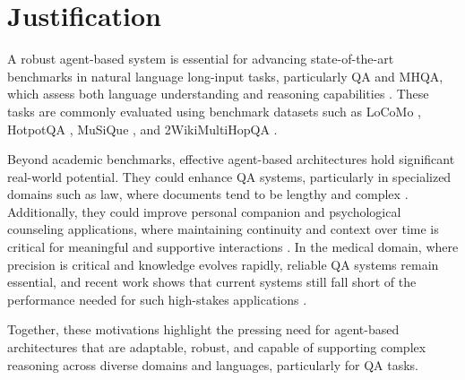 \section{Justification}
\label{sec:justification}

A robust agent-based system is essential for advancing state-of-the-art benchmarks in natural language long-input tasks, particularly QA and MHQA, which assess both language understanding and reasoning capabilities \cite{10.1561/1500000102}. These tasks are commonly evaluated using benchmark datasets such as LoCoMo \cite{maharana-etal-2024-evaluating}, HotpotQA \cite{yang2018hotpotqa}, MuSiQue \cite{trivedi2021musique}, and 2WikiMultiHopQA \cite{ho-etal-2020-constructing}.

\noindent Beyond academic benchmarks, effective agent-based architectures hold significant real-world potential.  They could enhance QA systems, particularly in specialized domains such as law, where documents tend to be lengthy and complex \cite{regnlp-ws-2025-1}. Additionally, they could improve personal companion and psychological counseling applications, where maintaining continuity and context over time is critical for meaningful and supportive interactions \cite{Zhong_Guo_Gao_Ye_Wang_2024}. In the medical domain, where precision is critical and knowledge evolves rapidly, reliable QA systems remain essential, and recent work shows that current systems still fall short of the performance needed for such high-stakes applications \cite{ALONSO2024102938}.

\noindent Together, these motivations highlight the pressing need for agent-based architectures that are adaptable, robust, and capable of supporting complex reasoning across diverse domains and languages, particularly for QA tasks.